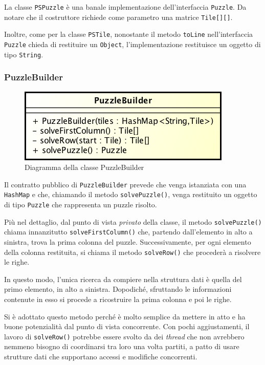 \documentclass[a4paper, 12pt]{article}
\begin{document}
        La classe \verb|PSPuzzle| è una banale implementazione dell'interfaccia \verb|Puzzle|. Da notare che il costruttore richiede come parametro una matrice \verb|Tile[][]|.

        Inoltre, come per la classe \verb|PSTile|, nonostante il metodo \verb|toLine| nell'interfaccia \verb|Puzzle| chieda di restituire un \verb|Object|, l'implementazione restituisce un oggetto di tipo \verb|String|.  

      \subsubsection{PuzzleBuilder}

        \begin{figure}[H]

          \centering
          \includegraphics[scale=0.7]{uml/puzzlebuilder.png}
          \caption{Diagramma della classe PuzzleBuilder}
          \label{uml:puzzlebuilder}

        \end{figure}

        Il contratto pubblico di \verb|PuzzleBuilder| prevede che venga istanziata con una \verb|HashMap| e che, chiamando il metodo \verb|solvePuzzle()|, venga restituito un oggetto di tipo \verb|Puzzle| che rappresenta un puzzle risolto.

        Più nel dettaglio, dal punto di vista \emph{privato} della classe, il metodo \verb|solvePuzzle()| chiama innanzitutto \verb|solveFirstColumn()| che, partendo dall'elemento in alto a sinistra, trova la prima colonna del puzzle. Successivamente, per ogni elemento della colonna restituita, si chiama il metodo \verb|solveRow()| che procederà a risolvere le righe.

        In questo modo, l'unica ricerca da compiere nella struttura dati è quella del primo elemento, in alto a sinistra. Dopodiché, sfruttando le informazioni contenute in esso si procede a ricostruire la prima colonna e poi le righe.

        Si è adottato questo metodo perché è molto semplice da mettere in atto e ha buone potenzialità dal punto di vista concorrente. Con pochi aggiustamenti, il lavoro di \verb|solveRow()| potrebbe essere svolto da dei \emph{thread} che non avrebbero nemmeno bisogno di coordinarsi tra loro una volta partiti, a patto di usare strutture dati che supportano accessi e modifiche concorrenti.
\end{document}
